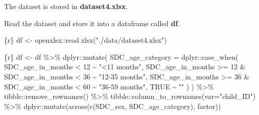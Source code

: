 \documentclass[
  letterpaper,
  DIV=11,
  numbers=noendperiod,
  oneside]{scrreprt}
\newenvironment{Shaded}{\begin{snugshade}}{\end{snugshade}}
\newcommand{\AttributeTok}[1]{\textcolor[rgb]{0.40,0.45,0.13}{#1}}
\newcommand{\ConstantTok}[1]{\textcolor[rgb]{0.56,0.35,0.01}{#1}}
\newcommand{\DecValTok}[1]{\textcolor[rgb]{0.68,0.00,0.00}{#1}}
\newcommand{\FunctionTok}[1]{\textcolor[rgb]{0.28,0.35,0.67}{#1}}
\newcommand{\InformationTok}[1]{\textcolor[rgb]{0.37,0.37,0.37}{#1}}
\newcommand{\NormalTok}[1]{\textcolor[rgb]{0.00,0.23,0.31}{#1}}
\newcommand{\OtherTok}[1]{\textcolor[rgb]{0.00,0.23,0.31}{#1}}
\newcommand{\SpecialCharTok}[1]{\textcolor[rgb]{0.37,0.37,0.37}{#1}}
\newcommand{\StringTok}[1]{\textcolor[rgb]{0.13,0.47,0.30}{#1}}
\begin{document}
The dataset is stored in \textbf{dataset4.xlsx}.

Read the dataset and store it into a dataframe called \textbf{df}.

\begin{Shaded}
\begin{Highlighting}[]
\InformationTok{\textasciigrave{}\textasciigrave{}\textasciigrave{}\{r\}}
\NormalTok{df }\OtherTok{\textless{}{-}}\NormalTok{ openxlsx}\SpecialCharTok{::}\FunctionTok{read.xlsx}\NormalTok{(}\StringTok{"./data/dataset4.xlsx"}\NormalTok{)}
\InformationTok{\textasciigrave{}\textasciigrave{}\textasciigrave{}}
\end{Highlighting}
\end{Shaded}

\begin{Shaded}
\begin{Highlighting}[]
\InformationTok{\textasciigrave{}\textasciigrave{}\textasciigrave{}\{r\}}
\NormalTok{df }\OtherTok{\textless{}{-}}\NormalTok{ df }\SpecialCharTok{\%\textgreater{}\%}
\NormalTok{  dplyr}\SpecialCharTok{::}\FunctionTok{mutate}\NormalTok{(}
    \AttributeTok{SDC\_age\_category =}\NormalTok{ dplyr}\SpecialCharTok{::}\FunctionTok{case\_when}\NormalTok{(}
\NormalTok{      SDC\_age\_in\_months }\SpecialCharTok{\textless{}} \DecValTok{12} \SpecialCharTok{\textasciitilde{}} \StringTok{"\textless{}11 months"}\NormalTok{,}
\NormalTok{      SDC\_age\_in\_months }\SpecialCharTok{\textgreater{}=} \DecValTok{12} \SpecialCharTok{\&}\NormalTok{ SDC\_age\_in\_months }\SpecialCharTok{\textless{}} \DecValTok{36} \SpecialCharTok{\textasciitilde{}} \StringTok{"12{-}35 months"}\NormalTok{,}
\NormalTok{      SDC\_age\_in\_months }\SpecialCharTok{\textgreater{}=} \DecValTok{36} \SpecialCharTok{\&}\NormalTok{ SDC\_age\_in\_months }\SpecialCharTok{\textless{}} \DecValTok{60} \SpecialCharTok{\textasciitilde{}} \StringTok{"36{-}59 months"}\NormalTok{,}
      \ConstantTok{TRUE} \SpecialCharTok{\textasciitilde{}} \StringTok{""}
\NormalTok{    )}
\NormalTok{  ) }\SpecialCharTok{\%\textgreater{}\%}
\NormalTok{  tibble}\SpecialCharTok{::}\FunctionTok{remove\_rownames}\NormalTok{() }\SpecialCharTok{\%\textgreater{}\%}
\NormalTok{  tibble}\SpecialCharTok{::}\FunctionTok{column\_to\_rownames}\NormalTok{(}\AttributeTok{var=}\StringTok{"child\_ID"}\NormalTok{) }\SpecialCharTok{\%\textgreater{}\%}
\NormalTok{  dplyr}\SpecialCharTok{::}\FunctionTok{mutate}\NormalTok{(}\FunctionTok{across}\NormalTok{(}\FunctionTok{c}\NormalTok{(SDC\_sex,}
\NormalTok{                         SDC\_age\_category), factor))}
\InformationTok{\textasciigrave{}\textasciigrave{}\textasciigrave{}}
\end{Highlighting}
\end{Shaded}
\end{document}
